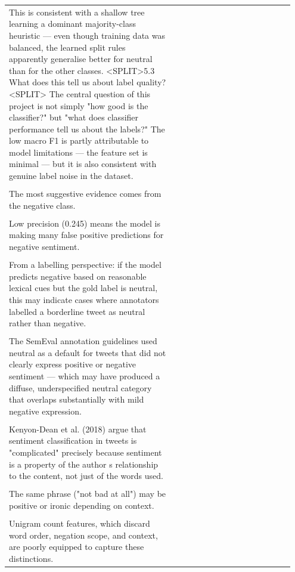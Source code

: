 \documentclass[11pt]{article}
\begin{document}
\begin{longtable}{|p{0.55\linewidth}|p{0.40\linewidth}|}
\hline
\rule{0pt}{3.5cm} & \\
\hline
This is consistent with a shallow tree learning a dominant majority-class heuristic --- even though training data was balanced, the learned split rules apparently generalise better for neutral than for the other classes. <SPLIT>5.3 What does this tell us about label quality?<SPLIT> The central question of this project is not simply "how good is the classifier?" but "what does classifier performance tell us about the labels?" The low macro F1 is partly attributable to model limitations --- the feature set is minimal --- but it is also consistent with genuine label noise in the dataset. & \\[2pt]
\hline
\rule{0pt}{3.5cm} & \\
\hline
The most suggestive evidence comes from the negative class. & \\[2pt]
\hline
\rule{0pt}{3.5cm} & \\
\hline
Low precision (0.245) means the model is making many false positive predictions for negative sentiment. & \\[2pt]
\hline
\rule{0pt}{3.5cm} & \\
\hline
From a labelling perspective: if the model predicts negative based on reasonable lexical cues but the gold label is neutral, this may indicate cases where annotators labelled a borderline tweet as neutral rather than negative. & \\[2pt]
\hline
\rule{0pt}{3.5cm} & \\
\hline
The SemEval annotation guidelines used neutral as a default for tweets that did not clearly express positive or negative sentiment --- which may have produced a diffuse, underspecified neutral category that overlaps substantially with mild negative expression. & \\[2pt]
\hline
\rule{0pt}{3.5cm} & \\
\hline
Kenyon-Dean et al. (2018) argue that sentiment classification in tweets is "complicated" precisely because sentiment is a property of the author s relationship to the content, not just of the words used. & \\[2pt]
\hline
\rule{0pt}{3.5cm} & \\
\hline
The same phrase ("not bad at all") may be positive or ironic depending on context. & \\[2pt]
\hline
\rule{0pt}{3.5cm} & \\
\hline
Unigram count features, which discard word order, negation scope, and context, are poorly equipped to capture these distinctions. & \\[2pt]

\end{longtable}
\end{document}
